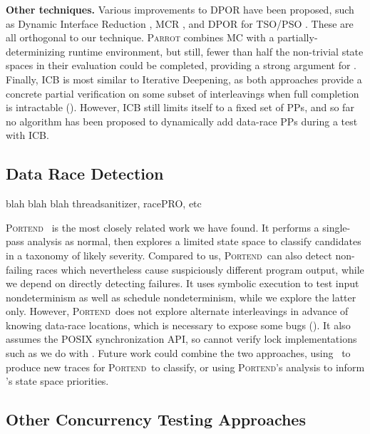{\bf Other techniques.} Various improvements to DPOR have been proposed, such as Dynamic Interface Reduction \cite{demeter}, MCR \cite{mcr}, and DPOR for TSO/PSO \cite{tsopso}.
These are all orthogonal to our technique.
\textsc{Parrot} \cite{parrot} combines MC with a partially-determinizing runtime environment, but still, fewer than half the non-trivial state spaces in their evaluation could be completed, providing a strong argument for \quicksand.
Finally, ICB \cite{chess} is most similar to Iterative Deepening, as both approaches provide a concrete partial verification on some subset of interleavings when full completion is intractable (\sect{\ref{sec:future}}).
However, ICB still limits itself to a fixed set of PPs, and so far no algorithm has been proposed to dynamically add data-race PPs during a test with ICB.

\subsection{Data Race Detection}

blah blah blah threadsanitizer, racePRO, etc

\newcommand\portend{\textsc{Portend}}
\portend~\cite{portend} is the most closely related work we have found.
It performs a single-pass analysis as normal, then explores a limited state space to classify candidates in a taxonomy of likely severity.
Compared to us, \portend~can also detect non-failing races which nevertheless cause suspiciously different program output,
while we depend on directly detecting failures.
It uses symbolic execution to test input nondeterminism as well as schedule nondeterminism,
while we explore the latter only.
However, \portend~does not explore alternate interleavings in advance of knowing data-race locations,
which is necessary to expose some bugs (\sect{\ref{sec:eval-falseneg}}).
It also assumes the POSIX synchronization API, so cannot verify lock implementations such as we do with \mxtest.
Future work could combine the two approaches, using \landslide~to produce new traces for \portend~to classify, or using \portend's analysis to inform \quicksand's state space priorities.

\subsection{Other Concurrency Testing Approaches} %

